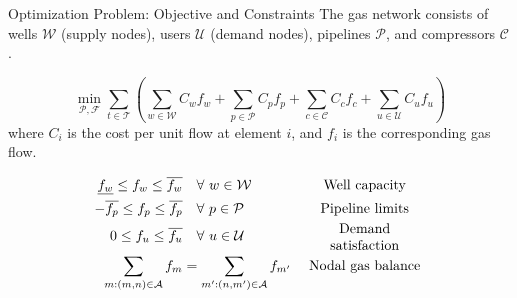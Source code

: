 \documentclass[hyperref={colorlinks,citecolor=blue,linkcolor=blue,urlcolor=blue}]{beamer}
\begin{document}
\begin{frame}{Optimization Problem: Objective and Constraints}
\footnotesize
The gas network consists of wells $\mathcal{W}$ (supply nodes), users $\mathcal{U}$ (demand nodes), pipelines $\mathcal{P}$, and compressors $\mathcal{C}$.

\[
\min_{\mathcal{P}, \mathcal{F}} 
\sum_{t \in \mathcal{T}} \left(
\sum_{w \in \mathcal{W}} C_{w} f_{w} +
\sum_{p \in \mathcal{P}} C_{p} f_{p} +
\sum_{c \in \mathcal{C}} C_{c} f_{c} +
\sum_{u \in \mathcal{U}} C_{u} f_{u}
\right)
\]
where $C_i$ is the cost per unit flow at element $i$, and $f_i$ is the corresponding gas flow.

\begin{align}
    \underline{f_{w}} \leq f_{w} \leq \overline{f_{w}} 
    &\quad \forall \ w \in \mathcal{W} 
    &&\parbox{3cm}{\centering Well capacity} \label{eq:well_limits} \\
    -\overline{f_{p}} \leq f_{p} \leq \overline{f_{p}} 
    &\quad \forall \ p \in \mathcal{P} 
    &&\parbox{3cm}{\centering Pipeline limits} \label{eq:pipe_limits} \\
    0 \leq f_{u} \leq \overline{f_{u}} 
    &\quad \forall \ u \in \mathcal{U} 
    &&\parbox{3cm}{\centering Demand satisfaction} \label{eq:dem_limit_gas} \\
    \sum_{m:(m,n)\in\mathcal{A}} f_{m} 
    &= \sum_{m':(n,m')\in\mathcal{A}} f_{m'} 
    &&\parbox{3cm}{\centering Nodal gas balance} \label{eq:gas_balance}
\end{align}
\end{frame}


%
\end{document}
